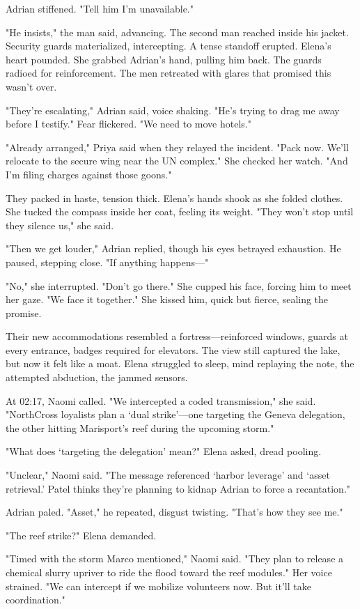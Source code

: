 Adrian stiffened. "Tell him I'm unavailable."

"He insists," the man said, advancing. The second man reached inside his jacket. Security guards materialized, intercepting. A tense standoff erupted. Elena's heart pounded. She grabbed Adrian's hand, pulling him back. The guards radioed for reinforcement. The men retreated with glares that promised this wasn't over.

"They're escalating," Adrian said, voice shaking. "He's trying to drag me away before I testify." Fear flickered. "We need to move hotels."

"Already arranged," Priya said when they relayed the incident. "Pack now. We'll relocate to the secure wing near the UN complex." She checked her watch. "And I'm filing charges against those goons."

They packed in haste, tension thick. Elena's hands shook as she folded clothes. She tucked the compass inside her coat, feeling its weight. "They won't stop until they silence us," she said.

"Then we get louder," Adrian replied, though his eyes betrayed exhaustion. He paused, stepping close. "If anything happens—"

"No," she interrupted. "Don't go there." She cupped his face, forcing him to meet her gaze. "We face it together." She kissed him, quick but fierce, sealing the promise.

Their new accommodations resembled a fortress—reinforced windows, guards at every entrance, badges required for elevators. The view still captured the lake, but now it felt like a moat. Elena struggled to sleep, mind replaying the note, the attempted abduction, the jammed sensors.

At 02:17, Naomi called. "We intercepted a coded transmission," she said. "NorthCross loyalists plan a `dual strike'—one targeting the Geneva delegation, the other hitting Marisport's reef during the upcoming storm."

"What does `targeting the delegation' mean?" Elena asked, dread pooling.

"Unclear," Naomi said. "The message referenced `harbor leverage' and `asset retrieval.' Patel thinks they're planning to kidnap Adrian to force a recantation."

Adrian paled. "Asset," he repeated, disgust twisting. "That's how they see me."

"The reef strike?" Elena demanded.

"Timed with the storm Marco mentioned," Naomi said. "They plan to release a chemical slurry upriver to ride the flood toward the reef modules." Her voice strained. "We can intercept if we mobilize volunteers now. But it'll take coordination."

